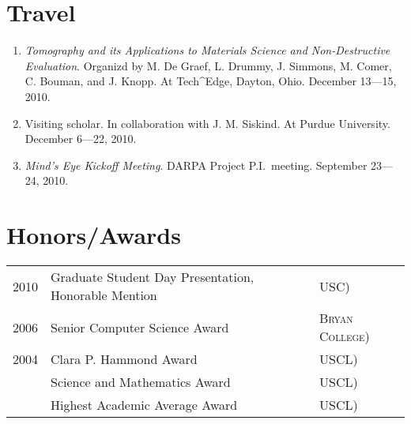\documentclass[a4paper,10pt]{article}
\begin{document}
\section{Travel}
\begin{enumerate}
\renewcommand{\labelenumi}{[T\arabic{enumi}] }
\item \emph{Tomography and its Applications to Materials Science and Non-Destructive Evaluation}. Organizd by M. De Graef, L. Drummy, J. Simmons, M. Comer, C. Bouman, and J. Knopp. At Tech\^{}Edge, Dayton, Ohio. December 13---15, 2010.
\item Visiting scholar. In collaboration with J. M. Siskind. At Purdue University. December 6---22, 2010.
\item \emph{Mind's Eye Kickoff Meeting}. DARPA Project P.I.~meeting. September 23---24, 2010. 
\end{enumerate}


\section{Honors/Awards}
\begin{tabular}{rl @{\hspace{0.5em}(} l}
2010 & Graduate Student Day Presentation,  Honorable Mention & \textsc{USC})\\
2006 & Senior Computer Science Award & \textsc{Bryan College})\\
2004 & Clara P. Hammond Award & \textsc{USCL})\\
& Science and Mathematics Award & \textsc{USCL})\\
& Highest Academic Average Award & \textsc{USCL})\\
\end{tabular}

\end{document}
